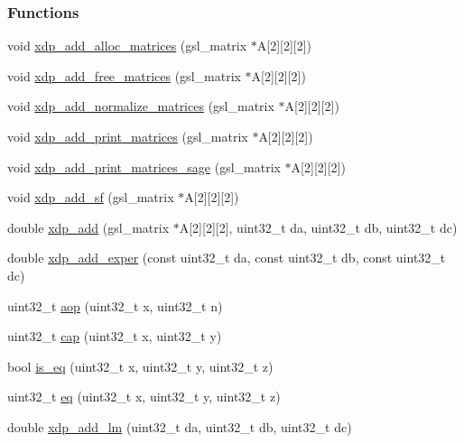 \subsubsection*{\-Functions}
\begin{DoxyCompactItemize}
\item 
void \hyperlink{xdp-add_8hh_a247fd733ccecc4e8431c6dad9c98458c}{xdp\-\_\-add\-\_\-alloc\-\_\-matrices} (gsl\-\_\-matrix $\ast$\-A\mbox{[}2\mbox{]}\mbox{[}2\mbox{]}\mbox{[}2\mbox{]})
\item 
void \hyperlink{xdp-add_8hh_a8b65b48440a5685a32623be15a5a9fd2}{xdp\-\_\-add\-\_\-free\-\_\-matrices} (gsl\-\_\-matrix $\ast$\-A\mbox{[}2\mbox{]}\mbox{[}2\mbox{]}\mbox{[}2\mbox{]})
\item 
void \hyperlink{xdp-add_8hh_a9fe9a298ec6ec4d7c8ed744b98f4c0ac}{xdp\-\_\-add\-\_\-normalize\-\_\-matrices} (gsl\-\_\-matrix $\ast$\-A\mbox{[}2\mbox{]}\mbox{[}2\mbox{]}\mbox{[}2\mbox{]})
\item 
void \hyperlink{xdp-add_8hh_a43f71c6ad463c37499d44c7e881c3702}{xdp\-\_\-add\-\_\-print\-\_\-matrices} (gsl\-\_\-matrix $\ast$\-A\mbox{[}2\mbox{]}\mbox{[}2\mbox{]}\mbox{[}2\mbox{]})
\item 
void \hyperlink{xdp-add_8hh_a5b76b0ac0f3edb9bd47a80348d5791ab}{xdp\-\_\-add\-\_\-print\-\_\-matrices\-\_\-sage} (gsl\-\_\-matrix $\ast$\-A\mbox{[}2\mbox{]}\mbox{[}2\mbox{]}\mbox{[}2\mbox{]})
\item 
void \hyperlink{xdp-add_8hh_af484105ee4ba34f7f20d63b798ebe851}{xdp\-\_\-add\-\_\-sf} (gsl\-\_\-matrix $\ast$\-A\mbox{[}2\mbox{]}\mbox{[}2\mbox{]}\mbox{[}2\mbox{]})
\item 
double \hyperlink{xdp-add_8hh_a25473697bd215fe5eb997574be30e6f3}{xdp\-\_\-add} (gsl\-\_\-matrix $\ast$\-A\mbox{[}2\mbox{]}\mbox{[}2\mbox{]}\mbox{[}2\mbox{]}, uint32\-\_\-t da, uint32\-\_\-t db, uint32\-\_\-t dc)
\item 
double \hyperlink{xdp-add_8hh_a2d199034befe8d8455790eee9ab64a25}{xdp\-\_\-add\-\_\-exper} (const uint32\-\_\-t da, const uint32\-\_\-t db, const uint32\-\_\-t dc)
\item 
uint32\-\_\-t \hyperlink{xdp-add_8hh_a73548e81294d367fba477ca730032c98}{aop} (uint32\-\_\-t x, uint32\-\_\-t n)
\item 
uint32\-\_\-t \hyperlink{xdp-add_8hh_ab047c892f50efee8a1f34009e9ff1fc1}{cap} (uint32\-\_\-t x, uint32\-\_\-t y)
\item 
bool \hyperlink{xdp-add_8hh_aae5f66f60161d925d6b538a044a838e4}{is\-\_\-eq} (uint32\-\_\-t x, uint32\-\_\-t y, uint32\-\_\-t z)
\item 
uint32\-\_\-t \hyperlink{xdp-add_8hh_a0d9c72df23f06118680b91d54462f22d}{eq} (uint32\-\_\-t x, uint32\-\_\-t y, uint32\-\_\-t z)
\item 
double \hyperlink{xdp-add_8hh_a3a5492de653e677266b5d01f366900d3}{xdp\-\_\-add\-\_\-lm} (uint32\-\_\-t da, uint32\-\_\-t db, uint32\-\_\-t dc)
\end{DoxyCompactItemize}


